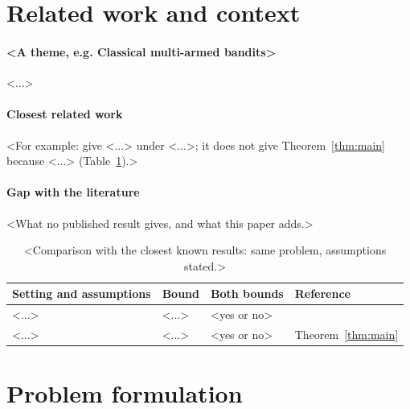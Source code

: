 \documentclass[11pt]{article}
\newcommand{\dt}[1]{\hypertarget{#1}{}}
\newcommand{\sy}[2]{\hyperlink{#1}{#2}}
\begin{document}
\section{Related work and context}\label{sec:related}

\paragraph{<A theme, e.g. Classical multi-armed bandits>} <...>

\paragraph{Closest related work} <For example: \citet[Theorem~1]{GMS19} give <...> under <...>; it
does not give Theorem~\ref{thm:main} because <...> (Table~\ref{tab:comparison}).>

\paragraph{Gap with the literature} <What no published result gives, and what this paper adds.>

\begin{table}[t]
\centering
\caption{<Comparison with the closest known results: same problem, assumptions stated.>}\label{tab:comparison}
\begin{tabular}{@{}llll@{}}
\toprule
Setting and assumptions & Bound & Both bounds & Reference \\
\midrule
<...> & <...> & <yes or no> & \citet[Theorem~1]{GMS19} \\
<...> & <...> & <yes or no> & Theorem~\ref{thm:main} \\
\bottomrule
\end{tabular}
\end{table}

\section{Problem formulation}\label{sec:setting}

\end{document}
